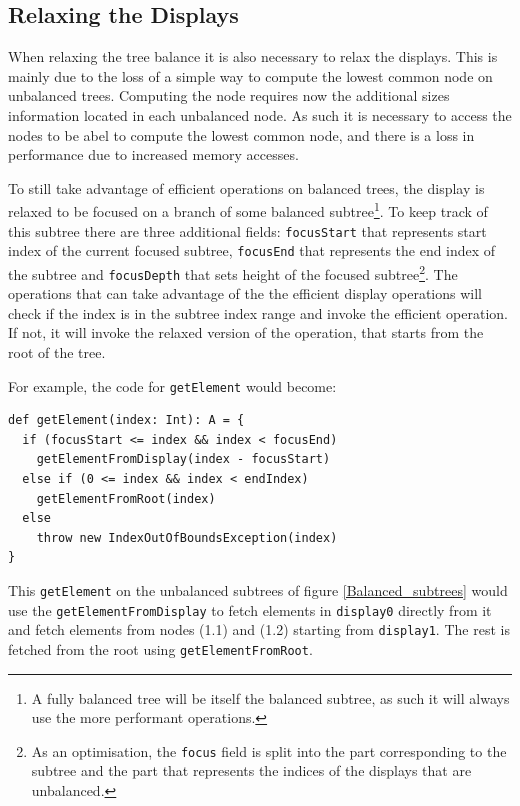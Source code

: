
\subsection{Relaxing the Displays}
When relaxing the tree balance it is also necessary to relax the displays. This is mainly due to the loss of a simple way to compute the lowest common node on unbalanced trees. Computing the node requires now the additional sizes information located in each unbalanced node. As such it is necessary to access the nodes to be abel to compute the lowest common node, and there is a loss in performance due to increased memory accesses. 

To still take advantage of efficient operations on balanced trees, the display is relaxed to be focused on a branch of some balanced subtree\footnote{A fully balanced tree will be itself the balanced subtree, as such it will always use the more performant operations.}. To keep track of this subtree there are three additional fields: \texttt{focusStart} that represents start index of the current focused subtree, \texttt{focusEnd} that represents the end index of the subtree and \texttt{focusDepth} that sets  height of the focused subtree\footnote{As an optimisation, the \texttt{focus} field is split into the part corresponding to the subtree and the part that represents the indices of the displays that are unbalanced.}. The operations that can take advantage of the the efficient display operations will check if the index is in the subtree index range and invoke the efficient operation. If not, it will invoke the relaxed version of the operation, that starts from the root of the tree.

For example, the code for \texttt{getElement} would become:
\begin{lstlisting}[frame=single]
def getElement(index: Int): A = {
  if (focusStart <= index && index < focusEnd) 
    getElementFromDisplay(index - focusStart)
  else if (0 <= index && index < endIndex) 
    getElementFromRoot(index)    
  else 
    throw new IndexOutOfBoundsException(index)
}
\end{lstlisting}

This \texttt{getElement} on the unbalanced subtrees of figure \ref{Balanced_subtrees}  would use the \texttt{getElementFromDisplay} to fetch elements in \texttt{display0} directly from it and fetch elements from nodes (1.1) and (1.2) starting from \texttt{display1}. The rest is fetched from the root using \texttt{getElementFromRoot}.

